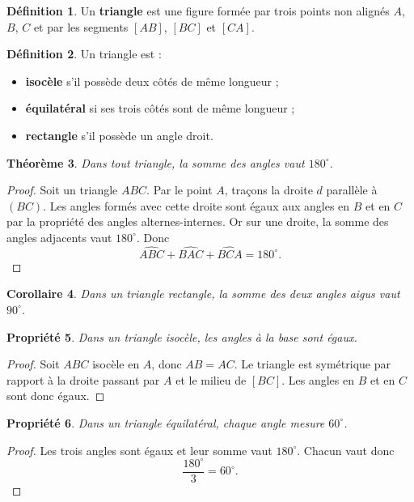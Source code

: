 \documentclass[11pt,a4paper]{article}
\theoremstyle{definition}
\newtheorem{definition}{Définition}[section]
\theoremstyle{plain}
\newtheorem{propriete}[definition]{Propriété}
\newtheorem{theoreme}[definition]{Théorème}
\newtheorem{corollaire}[definition]{Corollaire}
\begin{document}
\begin{definition}
Un \textbf{triangle} est une figure formée par trois points non alignés $A$, $B$, $C$ et par les segments $[AB]$, $[BC]$ et $[CA]$.
\end{definition}

\begin{definition}
Un triangle est :
\begin{itemize}
    \item \textbf{isocèle} s'il possède deux côtés de même longueur ;
    \item \textbf{équilatéral} si ses trois côtés sont de même longueur ;
    \item \textbf{rectangle} s'il possède un angle droit.
\end{itemize}
\end{definition}

\begin{theoreme}
Dans tout triangle, la somme des angles vaut $180^\circ$.
\end{theoreme}

\begin{proof}
Soit un triangle $ABC$.
Par le point $A$, traçons la droite $d$ parallèle à $(BC)$.
Les angles formés avec cette droite sont égaux aux angles en $B$ et en $C$ par la propriété des angles alternes-internes.
Or sur une droite, la somme des angles adjacents vaut $180^\circ$.
Donc
\[
\widehat{ABC}+\widehat{BAC}+\widehat{BCA}=180^\circ.
\]
\end{proof}

\begin{corollaire}
Dans un triangle rectangle, la somme des deux angles aigus vaut $90^\circ$.
\end{corollaire}

\begin{propriete}
Dans un triangle isocèle, les angles à la base sont égaux.
\end{propriete}

\begin{proof}
Soit $ABC$ isocèle en $A$, donc $AB=AC$.
Le triangle est symétrique par rapport à la droite passant par $A$ et le milieu de $[BC]$.
Les angles en $B$ et en $C$ sont donc égaux.
\end{proof}

\begin{propriete}
Dans un triangle équilatéral, chaque angle mesure $60^\circ$.
\end{propriete}

\begin{proof}
Les trois angles sont égaux et leur somme vaut $180^\circ$.
Chacun vaut donc
\[
\frac{180^\circ}{3}=60^\circ.
\]
\end{proof}
\end{document}

